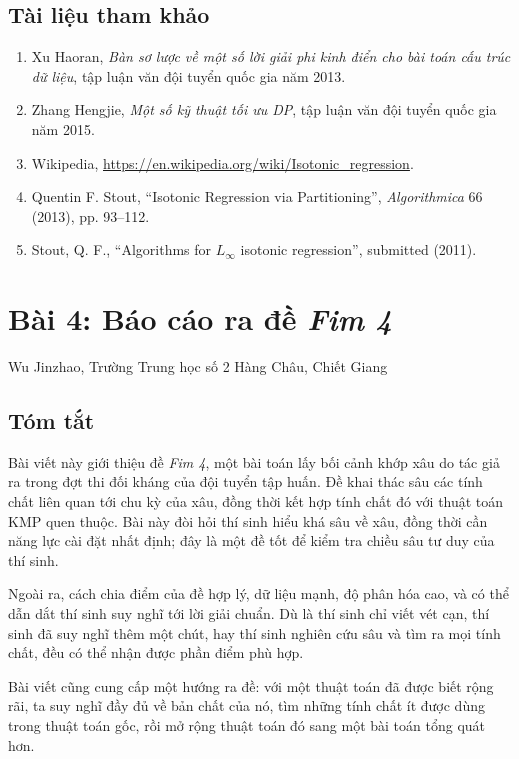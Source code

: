 \documentclass[11pt]{article}
\begin{document}
\subsection*{Tài liệu tham khảo}

\begin{enumerate}
  \item Xu Haoran, \emph{Bàn sơ lược về một số lời giải phi kinh điển cho bài
  toán cấu trúc dữ liệu}, tập luận văn đội tuyển quốc gia năm 2013.
  \item Zhang Hengjie, \emph{Một số kỹ thuật tối ưu DP}, tập luận văn đội tuyển
  quốc gia năm 2015.
  \item Wikipedia, \url{https://en.wikipedia.org/wiki/Isotonic_regression}.
  \item Quentin F. Stout, ``Isotonic Regression via Partitioning'',
  \emph{Algorithmica} 66 (2013), pp. 93--112.
  \item Stout, Q. F., ``Algorithms for \(L_\infty\) isotonic regression'',
  submitted (2011).
\end{enumerate}

\section{Bài 4: Báo cáo ra đề \emph{Fim 4}}

\begin{center}
Wu Jinzhao, Trường Trung học số 2 Hàng Châu, Chiết Giang
\end{center}

\subsection*{Tóm tắt}

Bài viết này giới thiệu đề \emph{Fim 4}, một bài toán lấy bối cảnh khớp xâu do
tác giả ra trong đợt thi đối kháng của đội tuyển tập huấn. Đề khai thác sâu các
tính chất liên quan tới chu kỳ của xâu, đồng thời kết hợp tính chất đó với
thuật toán KMP quen thuộc. Bài này đòi hỏi thí sinh hiểu khá sâu về xâu, đồng
thời cần năng lực cài đặt nhất định; đây là một đề tốt để kiểm tra chiều sâu tư
duy của thí sinh.

Ngoài ra, cách chia điểm của đề hợp lý, dữ liệu mạnh, độ phân hóa cao, và có
thể dẫn dắt thí sinh suy nghĩ tới lời giải chuẩn. Dù là thí sinh chỉ viết vét
cạn, thí sinh đã suy nghĩ thêm một chút, hay thí sinh nghiên cứu sâu và tìm ra
mọi tính chất, đều có thể nhận được phần điểm phù hợp.

Bài viết cũng cung cấp một hướng ra đề: với một thuật toán đã được biết rộng
rãi, ta suy nghĩ đầy đủ về bản chất của nó, tìm những tính chất ít được dùng
trong thuật toán gốc, rồi mở rộng thuật toán đó sang một bài toán tổng quát hơn.
\end{document}
